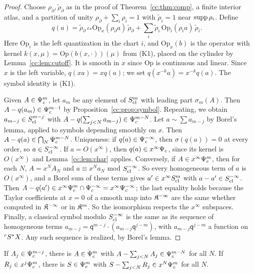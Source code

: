 \begin{proof}
Choose \(\rho_\partial,\tilde\rho_\partial\) as in the proof of
Theorem~\ref{cc:thm:comp}, a finite interior atlas, and a partition of
unity \(\rho_\partial+\sum_i\rho_i=1\) with \(\tilde\rho_i=1\) near
\(\operatorname{supp}\rho_i\). Define
\[
 q(a)=\tilde\rho_\partial\,\iota_*\mathrm{Op}_x(\rho_\partial a)\,
 \tilde\rho_\partial+\sum_i\tilde\rho_i\,\mathrm{Op}_i(\rho_ia)\,
 \tilde\rho_i .
\]
Here \(\mathrm{Op}_i\) is the left quantization in the chart \(i\), and
\(\mathrm{Op}_x(b)\) is the operator with kernel \(k(x,\mu)=
\mathrm{Op}(b(x,\cdot))(\mu)\) from (K1), placed on the cylinder by
Lemma~\ref{cc:lem:cutoff}. It is smooth in \(x\) since \(\mathrm{Op}\) is
continuous and linear. Since \(x\) is the left variable, \(q(xa)=xq(a)\);
we set \(q(x^{-k}a)=x^{-k}q(a)\). The symbol identity is (K1).

Given \(A\in\Psi_{c}^m\), let \(a_m\) be any element of \(S_{\mathrm{cl}}^m\) with
leading part \(\sigma_m(A)\). Then \(A-q(a_m)\in\Psi_{c}^{m-1}\) by
Proposition~\ref{cc:prop:symbol}. Repeating, we obtain \(a_{m-j}\in
S_{\mathrm{cl}}^{m-j}\) with \(A-q(\sum_{j<N}a_{m-j})\in\Psi_{c}^{m-N}\). Let \(a\sim
\sum a_{m-j}\) by Borel's lemma, applied to symbols depending smoothly on
\(x\). Then \(A-q(a)\in\bigcap_N\Psi_{c}^{m-N}\). Uniqueness: if \(q(a)\in
\Psi_{c}^{-\infty}\), then \(\sigma(q(a))=0\) at every order, so \(a\in
S_{\mathrm{cl}}^{-\infty}\). If \(a=O(x^\infty)\), then \(q(a)\in x^\infty\Psi_{c}\),
since its kernel is \(O(x^\infty)\) and Lemma~\ref{cc:lem:char} applies.
Conversely, if \(A\in x^\infty\Psi_{c}^m\), then for each \(N\),
\(A=x^NA_N\) and \(a\equiv x^Na_N\) mod \(S_{\mathrm{cl}}^{-\infty}\). So every
homogeneous term of \(a\) is \(O(x^\infty)\), and a Borel sum of these
terms gives \(a'\in x^\infty S_{\mathrm{cl}}^m\) with \(a-a'\in S_{\mathrm{cl}}^{-\infty}\). Then
\(A-q(a')\in x^\infty\Psi_{c}^m\cap\Psi_{c}^{-\infty}=x^\infty\Psi_{c}^{-\infty}\);
the last equality holds because the Taylor coefficients at \(x=0\) of a
smooth map into \(\mathfrak K^{-\infty}\) are the same whether computed in
\(\mathfrak K^{-\infty}\) or in \(\mathfrak K^m\). So the isomorphism respects the
\(x^\infty\) subspaces. Finally, a classical
symbol modulo \(S_{\mathrm{cl}}^{-\infty}\) is the same as its sequence of
homogeneous terms \(a_{m-j}=\mathsf q^{m-j}\cdot(a_{m-j}\mathsf
q^{j-m})\), with \(a_{m-j}\mathsf q^{j-m}\) a function on
\({}^cS^*X\). Any such sequence is realized, by Borel's lemma.
\end{proof}

\begin{lemma}\label{cc:lem:borel}
If \(A_j\in\Psi_{c}^{m-j}\), there is \(A\in\Psi_{c}^m\) with
\(A-\sum_{j<N}A_j\in\Psi_{c}^{m-N}\) for all \(N\). If \(R_j\in
x^j\Psi_{c}^m\), there is \(S\in\Psi_{c}^m\) with \(S-\sum_{j<N}R_j\in
x^N\Psi_{c}^m\) for all \(N\).
\end{lemma}


